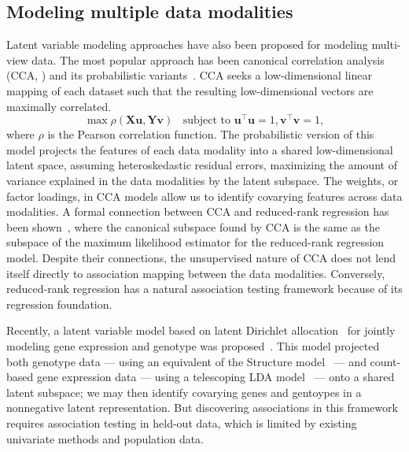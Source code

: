\documentclass{bmcart}
\begin{document}
\subsection*{Modeling multiple data modalities}
Latent variable modeling approaches have also been proposed for modeling multi-view data. The most popular approach has been canonical correlation analysis (CCA, \citep{hotelling1992relations}) and its probabilistic variants~\citep{bach2005probabilistic,zhao2016bayesian,argelaguet2018multi}. CCA seeks a low-dimensional linear mapping of each dataset such that the resulting low-dimensional vectors are maximally correlated.
\begin{equation*}
    \max \rho(\mathbf{X} \mathbf{u}, \mathbf{Y} \mathbf{v})~~~~\text{subject to } \mathbf{u}^\top \mathbf{u} = 1, \mathbf{v}^\top \mathbf{v} = 1,
\end{equation*}
where $\rho$ is the Pearson correlation function. The probabilistic version of this model projects the features of each data modality into a shared low-dimensional latent space, assuming heteroskedastic residual errors, maximizing the amount of variance explained in the data modalities by the latent subspace. The weights, or factor loadings, in CCA models allow us to identify covarying features across data modalities. A formal connection between CCA and reduced-rank regression has been shown~\citep{tso1981reduced}, where the canonical subspace found by CCA is the same as the subspace of the maximum likelihood estimator for the reduced-rank regression model. Despite their connections, the unsupervised nature of CCA does not lend itself directly to association mapping between the data modalities. Conversely, reduced-rank regression has a natural association testing framework because of its regression foundation.

Recently, a latent variable model based on latent Dirichlet allocation~\citep{blei2003latent,pritchard2000inference} for jointly modeling gene expression and genotype was proposed~\citep{gewirtz2021telescoping}. This model projected both genotype data --- using an equivalent of the Structure model~\citep{pritchard2000inference} --- and count-based gene expression data --- using a telescoping LDA model~\citep{blei2003latent} --- onto a shared latent subspace; we may then identify covarying genes and gentoypes in a nonnegative latent representation. But discovering associations in this framework requires association testing in held-out data, which is limited by existing univariate methods and population data.
\end{document}
